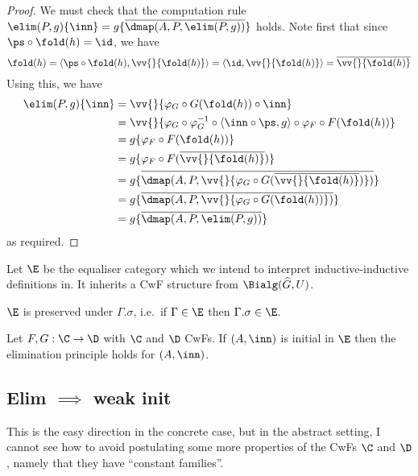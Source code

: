 \documentclass{article}
\begin{document}
\begin{proof}
We must check that the computation rule $\elim(P, g)\{\inn\} =
g\{\overline{\dmap(A, P, \elim(P, g))}\}$ holds. Note first that since
$\ps \circ \fold(h) = \id$, we have
\[
\fold(h) = \langle \ps \circ \fold(h), \vv{}\{\fold(h)\}\rangle
         = \langle \id , \vv{}\{\fold(h)\}\rangle
         = \overline{\vv{}\{\fold(h)\}}
\]
Using this, we have
\begin{align*}
  \elim(P, g)\{\inn\} &=  \vv{}\{\varphi_G \circ G(\fold(h)) \circ \inn\} \\
                      &=  \vv{}\{\varphi_G \circ \varphi_G^{-1} \circ \langle \inn \circ \ps, g\rangle \circ \varphi_F \circ F(\fold(h))\} \\
                      &=  g\{\varphi_F \circ F(\fold(h))\} \\
                      &=  g\{\varphi_F \circ F(\overline{\vv{}\{\fold(h)\}})\} \\
                      &=  g\{\overline{\dmap(A, P, \vv{}\{\varphi_G \circ G(\overline{\vv{}\{\fold(h)\}})\})}\} \\
                      &=  g\{\overline{\dmap(A, P, \vv{}\{\varphi_G \circ G(\fold(h))\})}\} \\
                      &=  g\{\overline{\dmap(A, P, \elim(P, g))}\}
\end{align*}
as required.
\end{proof}

Let $\E$ be the equaliser category which we intend to interpret
inductive-inductive definitions in. It inherits a CwF structure from
$\Bialg(\widehat{G}, U)$.

\begin{lemma}
  $\E$ is preserved under $\Gamma.\sigma$, i.e.\ if $\Gamma \in \E$ then $\Gamma.\sigma \in \E$.
\end{lemma}

\begin{corollary}
    Let $F, G : \C \to \D$ with $\C$ and $\D$ CwFs. If $(A, \inn)$ is
  initial in $\E$ then the elimination principle holds for
  $(A, \inn)$.
\end{corollary}

\subsection{Elim $\implies$ weak init}

This is the easy direction in the concrete case, but in the abstract
setting, I cannot see how to avoid postulating some more properties of
the CwFs $\C$ and $\D$, namely that they have ``constant families''.
\end{document}
